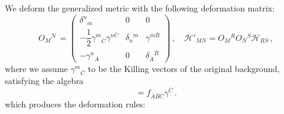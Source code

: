 \documentclass[12pt, utf8]{article}
\numberwithin{equation}{section}
\begin{document}
We deform the generalized metric  with the following deformation matrix:
\begin{equation} \label{deformation_matrix}
     O_{M}{}^{N} \,    =  \left(
  \begin{array}{ccc} 
  \delta^{n}{}_m & 0 & 0\\
   - \dfrac{1}{2}\gamma^m{}_{\bar{C}} \gamma^{ n \bar{C}} & \delta_{n}{}^m & \gamma^{m \bar{B}} \\
  -\gamma^{n}{}_{\bar{A}} & 0 & \delta_{\bar{A}}{}^{\bar{B}}
   \end{array}
   \right) \, , \quad \mathcal{H}'_{M N} = O_{M}{}^{R}O_{N}{}^{S}\mathcal{H}_{R S} \, ,
\end{equation}
where we assume  $\gamma^m{}_{\bar{C}}$ to be the Killing vectors of the original background, satisfying the  algebra
\begin{equation}
    [\gamma_{\bar{A}}, \gamma_{\bar{B}}] = f_{\bar{A}\bar{B} \bar{C}} \gamma^{\bar{C}} \, . 
\end{equation}
which produces the deformation rules: 
\end{document}
